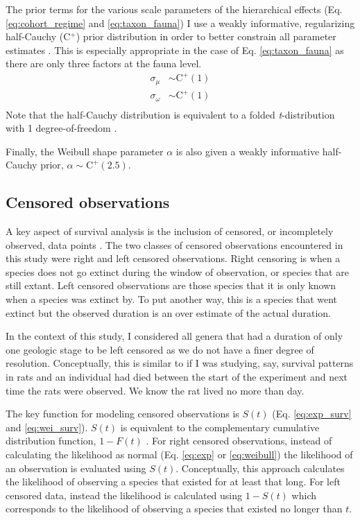 \documentclass[12pt,letterpaper]{article}
\begin{document}
The prior terms for the various scale parameters of the hierarchical effects (Eq. \ref{eq:cohort_regime} and \ref{eq:taxon_fauna}) I use a weakly informative, regularizing half-Cauchy (C\(^{+}\)) prior distribution in order to better constrain all parameter estimates \citep{Gelman2013d}. This is especially appropriate in the case of Eq. \ref{eq:taxon_fauna} as there are only three factors at the fauna level. 
\begin{equation}
  \begin{aligned}
    \sigma_{\mu} &\sim \mathrm{C}^{+}(1) \\
    \sigma_{\omega} &\sim \mathrm{C}^{+}(1) \\
  \end{aligned}
  \label{eq:scale_priors}
\end{equation}
Note that the half-Cauchy distribution is equivalent to a folded \textit{t}-distribution with 1 degree-of-freedom \citep{Gelman2013d}.

Finally, the Weibull shape parameter \(\alpha\) is also given a weakly informative half-Cauchy prior, \(\alpha \sim \mathrm{C}^{+}(2.5)\). 

\subsection{Censored observations}
A key aspect of survival analysis is the inclusion of censored, or incompletely observed, data points \citep{Ibrahim2001,Klein2003}. The two classes of censored observations encountered in this study were right and left censored observations. Right censoring is when a species does not go extinct during the window of observation, or species that are still extant. Left censored observations are those species that it is only known when a species was extinct by. To put another way, this is a species that went extinct but the observed duration is an over estimate of the actual duration. 

In the context of this study, I considered all genera that had a duration of only one geologic stage to be left censored as we do not have a finer degree of resolution. Conceptually, this is similar to if I was studying, say, survival patterns in rats and an individual had died between the start of the experiment and next time the rats were observed. We know the rat lived no more than day.

The key function for modeling censored observations is \(S(t)\) (Eq. \ref{eq:exp_surv} and \ref{eq:wei_surv}). \(S(t)\) is equivalent to the complementary cumulative distribution function, \(1 - F(t)\) \citep{Klein2003}. For right censored observations, instead of calculating the likelihood as normal (Eq. \ref{eq:exp} or \ref{eq:weibull}) the likelihood of an observation is evaluated using \(S(t)\). Conceptually, this approach calculates the likelihood of observing a species that existed for at least that long. For left censored data, instead the likelihood is calculated using \(1 - S(t)\) which corresponds to the likelihood of observing a species that existed no longer than \(t\).
\end{document}

